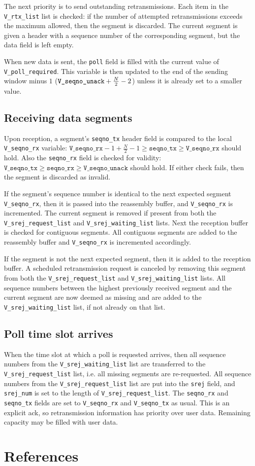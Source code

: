 \documentclass[a4paper]{article}
\newcommand{\nr}{\texttt{seqno\_{}rx}}
\newcommand{\ns}{\texttt{seqno\_{}tx}}
\newcommand{\poll}{\texttt{poll}}
\newcommand{\srej}{\texttt{srej}}
\newcommand{\srejnum}{\texttt{srej\_{}num}}
\newcommand{\vr}{\texttt{V\_{}seqno\_{}rx}}
\newcommand{\vs}{\texttt{V\_{}seqno\_{}tx}}
\newcommand{\va}{\texttt{V\_{}seqno\_{}unack}}
\newcommand{\pr}{\texttt{V\_{}poll\_{}required}}
\newcommand{\srejr}{\texttt{V\_{}srej\_{}request\_{}list}}
\newcommand{\srejw}{\texttt{V\_{}srej\_{}waiting\_{}list}}
\newcommand{\rtx}{\texttt{V\_{}rtx\_{}list}}
\begin{document}
		The next priority is to send outstanding retransmissions.
		Each item in the \rtx{} list is checked: if the number of attempted retransmissions exceeds the maximum allowed, then the segment is discarded.
		The current segment is given a header with a sequence number of the corresponding segment, but the data field is left empty.
		
		When new data is sent, the \poll{} field is filled with the current value of \pr{}.
		This variable is then updated to the end of the sending window minus $1$ ($\text{\va} + \frac{N}{2}-2$) unless it is already set to a smaller value.
		
	\subsection{Receiving data segments}\label{sec:arq_receiving}
		Upon reception, a segment's \ns{} header field is compared to the local \vr{} variable: $\vr{} - 1 + \frac{N}{2} - 1 \geq \ns{} \geq \vr{}$ should hold.
		Also the \nr{} field is checked for validity: $\vs{} \geq \nr{} \geq \va{}$ should hold.
		If either check fails, then the segment is discarded as invalid.
		
		If the segment's sequence number is identical to the next expected segment \vr{}, then it is passed into the reassembly buffer, and \vr{} is incremented.
		The current segment is removed if present from both the \srejr{} and \srejw{} lists.
		Next the reception buffer is checked for contiguous segments.
		All contiguous segments are added to the reassembly buffer and \vr{} is incremented accordingly.
		
		If the segment is not the next expected segment, then it is added to the reception buffer.
		A scheduled retransmission request is canceled by removing this segment from both the \srejr{} and \srejw{} lists.
		All sequence numbers between the highest previously received segment and the current segment are now deemed as missing and are added to the \srejw{} list, if not already on that list.
		
	\subsection{Poll time slot arrives}\label{sec:arq_poll}
		When the time slot at which a poll is requested arrives, then all sequence numbers from the \srejw{} list are transferred to the \srejr{} list, i.e. all missing segments are re-requested.
		All sequence numbers from the \srejr{} list are put into the \srej{} field, and \srejnum{} is set to the length of \srejr{}.
		The \nr{} and \ns{} fields are set to \vr{} and \vs{} as usual.
		This is an explicit \ac{ack}, so retransmission information has priority over user data.
		Remaining capacity may be filled with user data.		
			
	\appendix
	\section{References}
		\printbibliography[heading=none]
	
\end{document}
